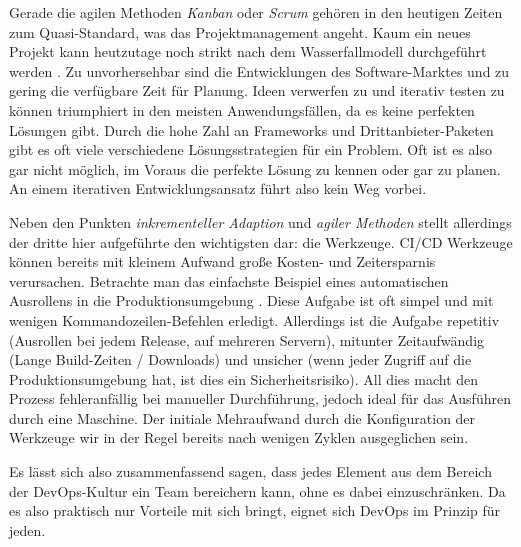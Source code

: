 Gerade die agilen Methoden \emph{Kanban} oder \emph{Scrum} \cite{froemlingAgileMethodenWas2021} gehören in den heutigen Zeiten zum Quasi-Standard, was das Projektmanagement angeht. Kaum ein neues Projekt kann heutzutage noch strikt nach dem Wasserfallmodell durchgeführt werden \cite{tutorialspointSDLCWaterfallModel}. Zu unvorhersehbar sind die Entwicklungen des Software-Marktes und zu gering die verfügbare Zeit für Planung.
Ideen verwerfen zu und iterativ testen zu können triumphiert in den meisten Anwendungsfällen, da es keine \glqq perfekten\grqq{} Lösungen gibt.
Durch die hohe Zahl an Frameworks und Drittanbieter-Paketen gibt es oft viele verschiedene Lösungsstrategien für ein Problem.
Oft ist es also gar nicht möglich, im Voraus die \glqq perfekte\grqq{} Lösung zu kennen oder gar zu planen. An einem iterativen Entwicklungsansatz führt also kein Weg vorbei.

Neben den Punkten \emph{inkrementeller Adaption} und \emph{agiler Methoden} stellt allerdings der dritte hier aufgeführte den wichtigsten dar: die Werkzeuge.
CI/CD Werkzeuge können bereits mit kleinem Aufwand große Kosten- und Zeitersparnis verursachen. 
Betrachte man das einfachste Beispiel eines automatischen Ausrollens in die Produktionsumgebung \cite{sonBeginnerGuideBuilding2019}. 
Diese Aufgabe ist oft simpel und mit wenigen Kommandozeilen-Befehlen erledigt. Allerdings ist die Aufgabe repetitiv (Ausrollen bei jedem Release, auf mehreren Servern), mitunter Zeitaufwändig (Lange Build-Zeiten / Downloads) und unsicher (wenn jeder Zugriff auf die Produktionsumgebung hat, ist dies ein Sicherheitsrisiko).
All dies macht den Prozess fehleranfällig bei manueller Durchführung, jedoch ideal für das Ausführen durch eine Maschine. 
Der initiale Mehraufwand durch die Konfiguration der Werkzeuge wir in der Regel bereits nach wenigen Zyklen ausgeglichen sein. 

Es lässt sich also zusammenfassend sagen, dass jedes Element aus dem Bereich der DevOps-Kultur ein Team bereichern kann, ohne es dabei einzuschränken.
Da es also praktisch nur Vorteile mit sich bringt, eignet sich DevOps im Prinzip für jeden.
